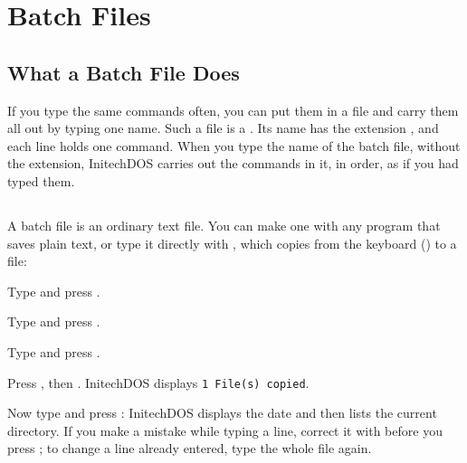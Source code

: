 \chapter{Batch Files}

\section{What a Batch File Does}
If you type the same commands often, you can put them in a file and carry
them all out by typing one name.  Such a file is a .  Its
name has the extension , and each line holds one command.  When
you type the name of the batch file, without the extension, InitechDOS
carries out the commands in it, in order, as if you had typed them.

\section{}
A batch file is an ordinary text file.  You can make one with any program
that saves plain text, or type it directly with , which copies
from the keyboard () to a file:
\begin{Steps}
\item Type  and press .
\item Type  and press .
\item Type  and press .
\item Press , then .  InitechDOS displays
  \texttt{1 File(s) copied}.
\end{Steps}
Now type  and press : InitechDOS displays the date
and then lists the current directory.  If you make a mistake while typing a
line, correct it with  before you press ; to
change a line already entered, type the whole file again.

